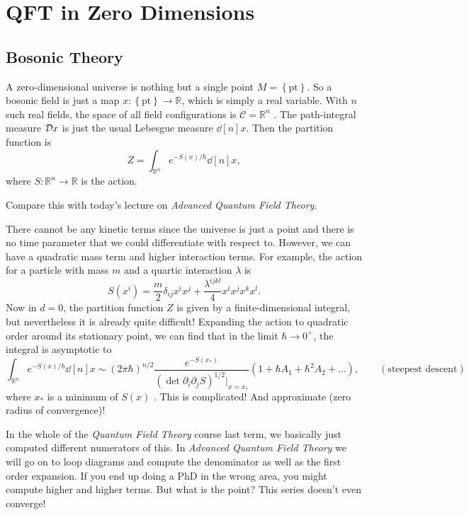 \section{QFT in Zero Dimensions}%
\label{sec:qft_in_zero_dimensions}

\subsection{Bosonic Theory}%
\label{sub:bosonic_theory}

A zero-dimensional universe is nothing but a single point $M = \left\{ \text{pt} \right\}$. So a bosonic field is just a map $x \colon \left\{ \text{pt} \right\} \to \mathbb{R}$, which is simply a real variable.
With $n$ such real fields, the space of all field configurations is $\mathcal{C} = \mathbb{R}^n$ .
The path-integral measure $\mathop{\mathcal{D} x}$ is just the usual Lebesgue measure $\dd[n]{x}$. 
Then the partition function is
\begin{equation}
  Z = \int_{\mathbb{R}^n} e^{- {S}(x) / \hbar} \dd[n]{x}, 
\end{equation}
where $S \colon \mathbb{R}^n \to \mathbb{R}$ is the action.
\begin{leftbar}
  Compare this with today's lecture on \emph{Advanced Quantum Field Theory}.
\end{leftbar}
There cannot be any kinetic terms since the universe is just a point and there is no time parameter that we could differentiate with respect to.
However, we can have a quadratic mass term and higher interaction terms. For example, the action for a particle with mass $m$ and a quartic interaction $\lambda$ is
\begin{equation}
  S(x^{i}) = \frac{m}{2} \delta_{ij} x^{i} x^{j} + \frac{\lambda^{ijkl}}{4} x^{i} x^{j} x^{k} x^{l}.
\end{equation}
Now in $d = 0$, the partition function $Z$ is given by a finite-dimensional integral, but nevertheless it is already quite difficult! Expanding the action to quadratic order around its stationary point, we can find that in the limit  $\hbar \to 0^+$, the integral is asymptotic to
 \begin{equation}
   \int_{\mathbb{R}^n} e^{-S(x) / \hbar} \dd[n]{x} \sim (2 \pi \hbar)^{n / 2} \frac{e^{-S(x_*)}}{(\det \partial_{i} \partial_{j} S)^{1 / 2}\rvert_{x = x_*}}
   \left(  1 + \hbar A_1 + \hbar^2 A_2 + \dots \right), \qquad (\text{steepest descent})
\end{equation}
where $x_*$ is a minimum of  $S(x)$ .
This is complicated! And approximate (zero radius of convergence)! 
\begin{remark}
  In the whole of the \emph{Quantum Field Theory} course last term, we basically just computed different numerators of this. In \emph{Advanced Quantum Field Theory} we will go on to loop diagrams and compute the denominator as well as the first order expansion.
  If you end up doing a PhD in the wrong area, you might compute higher and higher terms. But what is the point? This series doesn't even converge!
\end{remark}

